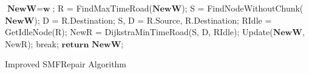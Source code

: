 \begin{algorithm}[htpb]
	\begin{algorithmic}[1]
		\setlength{\commentindent}{.3\textwidth}
		\setlength{\algorithmicindent}{1.5em}
		\renewcommand{\algorithmiccomment}[1]{\unskip\hfill\makebox[\commentindent][l]{$\rhd$~#1}\par}
		\LetLtxMacro{\oldalgorithmic}{\algorithmic}
		\renewcommand{\algorithmic}[1][0]{
			\oldalgorithmic[#1]
			\renewcommand{\ALC@com}[1]{
				\IFnum\pdfstrcmp{##1}{default}=0\ELSE\algorithmiccomment{##1}\fi}%
		}
		\STATE $\textbf{NewW} = \textbf{w}$;
		\STATE R = FindMaxTimeRoad($\textbf{NewW}$);
		\STATE S = FindNodeWithoutChunk($\textbf{NewW}$);
		\STATE D = R.Destination;
		\ELSE
		\STATE S, D = R.Source, R.Destination;
		\ENDIF
		\STATE RIdle = GetIdleNode(R);
		\STATE NewR = DijkstraMinTimeRoad(S, D, RIdle);
		\STATE Update($\textbf{NewW}$, NewR);
		\STATE break;
		\ENDIF
		\ENDWHILE
		\STATE $\textbf{return}$ $\textbf{NewW}$;
	\end{algorithmic}
	\caption{Improved SMFRepair Algorithm}
	\label{alg:3-2}
\end{algorithm}